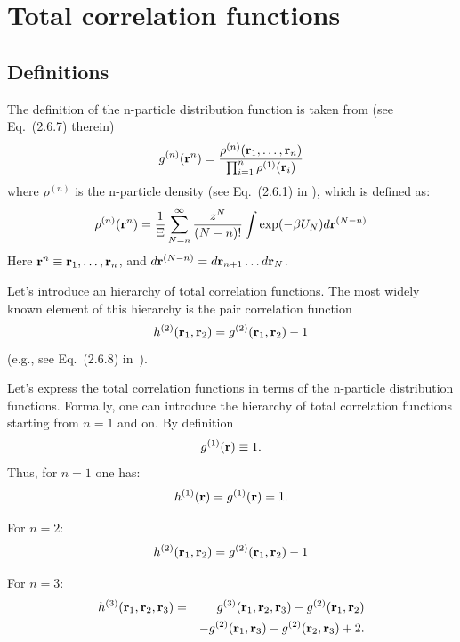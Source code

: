 \section{\label{sec:total_corr_func} Total correlation functions}
\subsection{Definitions}
The definition of the n-particle distribution function is taken from \cite{HANSEN2013ch2} (see Eq.~(2.6.7) therein)
\begin{equation}
\label{def:g_n}
g^{(n)}(\vb{r}^n)=\frac{\rho^{(n)}(\vb{r}_1,\dotsc,\vb{r}_n)}{\prod_{i=1}^{n}\rho^{(1)}(\vb{r}_i)}
\end{equation}
where $\rho^{(n)}$ is the n-particle density (see Eq.~(2.6.1) in \cite{HANSEN2013ch2}), which is defined as:
\begin{eqnarray}
	\label{def:rho_n}
	\rho^{(n)}(\vb r^n) = \frac{1}{\Xi}\sum_{N=n}^{\infty} \frac{z^N}{(N-n)!} \int\exp(-\beta U_N) d\vb r^{(N-n)}
\end{eqnarray}
Here $\vb r^n \equiv \vb r_1, \dotsc, \vb r_n$, and $d\vb r^{(N-n)} = d\vb r_{n+1} \dotsc d\vb r_N$.

Let's introduce an hierarchy of total correlation functions. The most widely known element of this hierarchy is the pair correlation function
\begin{equation}
\label{def:pair_corr_func}
h^{(2)}(\vb{r}_1,\vb{r}_2) = g^{(2)}(\vb{r}_1,\vb{r}_2) - 1
\end{equation}
(e.g., see Eq.~(2.6.8) in~\cite{HANSEN2013ch2}).

Let's express the total correlation functions in terms of the n-particle distribution functions.
Formally, one can introduce the hierarchy of total correlation functions starting from $n=1$ and on.
By definition
\begin{equation}
g^{(1)}(\vb{r})\equiv 1.
\end{equation}
Thus, for $n=1$ one has: 
\begin{equation}
h^{(1)}(\vb{r}) = g^{(1)}(\vb{r}) = 1.
\end{equation}

For $n=2$:
\begin{equation}
h^{(2)}(\vb{r}_1,\vb{r}_2) = g^{(2)}(\vb{r}_1,\vb{r}_2) - 1
\end{equation}

For $n=3$:
\begin{eqnarray}
h^{(3)}(\vb{r}_1 ,\vb{r}_2, \vb{r}_3) &=& g^{(3)}(\vb{r}_1, \vb{r}_2, \vb{r}_3) - g^{(2)}(\vb{r}_1, \vb{r}_2) 
\nonumber\\
&&-g^{(2)}(\vb{r}_1,\vb{r}_3) -  g^{(2)}(\vb{r}_2,\vb{r}_3) +2.
\end{eqnarray}

